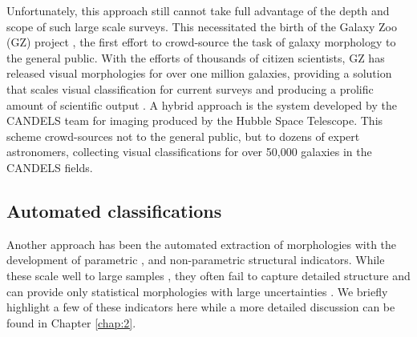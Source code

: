 Unfortunately, this approach still cannot take full advantage of the depth and scope of such large scale surveys. This necessitated the birth of the Galaxy Zoo (GZ) project \citep{Lintott2008, Lintott2011, Willett2013, Willett2017, Simmons2017}, the first effort to crowd-source the task of galaxy morphology to the general public. With the efforts of thousands of citizen scientists, GZ has released visual morphologies for over one million galaxies, providing a solution that scales visual classification for current surveys and producing a prolific amount of scientific output \citep[e.g.,][]{Land2008, Bamford2009, Darg2010, Schawinski2014, Galloway2015, Smethurst2016}.
A hybrid approach is the system developed by the CANDELS \citep{Grogin2011, Koekemoer2011} team for imaging produced by the Hubble Space Telescope. This scheme \citep{Kartaltepe2015} crowd-sources not to the general public, but to dozens of expert astronomers, collecting visual classifications for over 50,000 galaxies in the CANDELS fields. 


\subsection{Automated classifications}
Another approach has been the automated extraction of morphologies with the development of parametric \citep{Sersic1968, Odewahn2002, Peng2002}, and non-parametric 
\citep{Abraham1994, 
	   Conselice2003, 
	   Abraham2003, 
	   Lotz2004,  
	   Freeman2013} 
structural indicators. While these scale well to large samples 
\citep[e.g.,][]{Simard2011, 
			Griffith2012, 
			Casteels2014, 
			Holwerda2014, 
			Meert2016}, 
they often fail to capture detailed structure and can provide only statistical morphologies with large uncertainties \cite[e.g.,][]{Abraham1996, Bershady2000}. We briefly highlight a few of these indicators here while a more detailed discussion can be found in Chapter \ref{chap:2}. 

